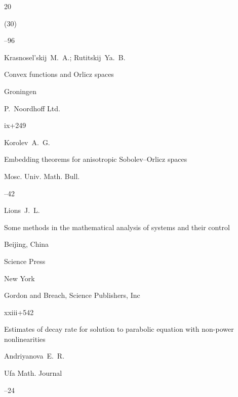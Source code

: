 \begin{thebibliography}{20}

(30)

--96







\by Krasnosel'skij~M.~A.; Rutitskij~Ya.~B.

\book Convex functions and Orlicz spaces

\publaddr Groningen

\publ P.~Noordhoff Ltd.

\totalpages ix+249









\by Korolev~A.~G.

\paper Embedding theorems for anisotropic Sobolev--Orlicz spaces

\jour Mosc. Univ. Math. Bull.



--42







\by Lions~J.~L.

\book Some methods in the mathematical analysis of systems and their control


\publaddr Beijing, China

\publ Science Press

\publaddrr New York

\publl Gordon and Breach, Science Publishers, Inc

\totalpages xxiii+542





\paper Estimates of decay rate for solution to parabolic equation with non-power nonlinearities

\by Andriyanova~E.~R.

\jour Ufa Math. Journal




--24





\end{thebibliography}



